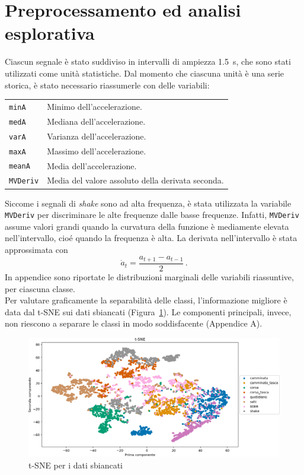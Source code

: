 \documentclass[./main.tex]{subfiles}
\begin{document}
\section{Preprocessamento ed analisi esplorativa}
Ciascun segnale è stato suddiviso in intervalli di ampiezza \SI{1.5}{s}, che sono stati utilizzati come unità statistiche. Dal momento che ciascuna unità è una serie storica, è stato necessario riassumerle con delle variabili:
\begin{table}[H]
	\centering
	\begin{tabular}{ll}
		\texttt{minA}& Minimo dell'accelerazione.\\
		\texttt{medA}& Mediana dell'accelerazione.\\
		\texttt{varA}& Varianza dell'accelerazione.\\
		\texttt{maxA}& Massimo dell'accelerazione.\\
		\texttt{meanA}& Media dell'accelerazione.\\
		\texttt{MVDeriv}& Media del valore assoluto della derivata seconda.
	\end{tabular}
\end{table}
Siccome i segnali di {\em shake} sono ad alta frequenza, è stata utilizzata la variabile \texttt{MVDeriv} per discriminare le alte frequenze dalle basse frequenze. Infatti, \texttt{MVDeriv} assume valori grandi quando la curvatura della funzione è mediamente elevata nell'intervallo, cioé quando la frequenza è alta. La derivata nell'intervallo è stata approssimata con \cite{NumpyGradientNumPy}
\[
\dot{a}_t = \dfrac{a_{t + 1} - a_{t - 1}}{2}\,.
\]
In appendice sono riportate le distribuzioni marginali delle variabili riassuntive, per ciascuna classe.\\

Per valutare graficamente la separabilità delle classi, l'informazione migliore è data dal t-SNE sui dati sbiancati (Figura~\ref{fig:tsne}). Le componenti principali, invece, non riescono a separare le classi in modo soddisfacente (Appendice A).
\begin{figure}[H]
	\centering
	\includegraphics[width=.8\textwidth]{../../figure/t-SNE.png}
	\caption{{ t-SNE per i dati sbiancati}}
	\label{fig:tsne}
\end{figure}
\end{document}
